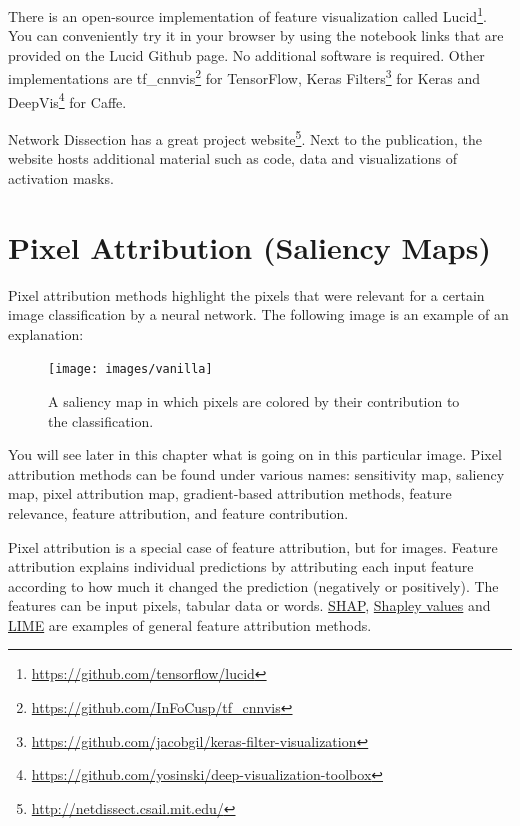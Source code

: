 \documentclass[
  11pt,
]{scrbook}
\renewcommand{\href}[2]{#2\footnote{\url{#1}}}
\begin{document}
There is an open-source implementation of feature visualization called \href{https://github.com/tensorflow/lucid}{Lucid}.
You can conveniently try it in your browser by using the notebook links that are provided on the Lucid Github page.
No additional software is required.
Other implementations are \href{https://github.com/InFoCusp/tf_cnnvis}{tf\_cnnvis} for TensorFlow, \href{https://github.com/jacobgil/keras-filter-visualization}{Keras Filters} for Keras and \href{https://github.com/yosinski/deep-visualization-toolbox}{DeepVis} for Caffe.

Network Dissection has a great \href{http://netdissect.csail.mit.edu/}{project website}.
Next to the publication, the website hosts additional material such as code, data and visualizations of activation masks.

\newpage

\hypertarget{pixel-attribution}{%
\section{Pixel Attribution (Saliency Maps)}\label{pixel-attribution}}

Pixel attribution methods highlight the pixels that were relevant for a certain image classification by a neural network.
The following image is an example of an explanation:

\begin{figure}

{\centering \texttt{[image: images/vanilla]} 

}

\caption{A saliency map in which pixels are colored by their contribution to the classification.}\label{fig:unnamed-chunk-58}
\end{figure}

You will see later in this chapter what is going on in this particular image.
Pixel attribution methods can be found under various names: sensitivity map, saliency map, pixel attribution map, gradient-based attribution methods, feature relevance, feature attribution, and feature contribution.

Pixel attribution is a special case of feature attribution, but for images.
Feature attribution explains individual predictions by attributing each input feature according to how much it changed the prediction (negatively or positively).
The features can be input pixels, tabular data or words.
\protect\hyperlink{shap}{SHAP}, \protect\hyperlink{shapley}{Shapley values} and \protect\hyperlink{lime}{LIME} are examples of general feature attribution methods.
\end{document}
